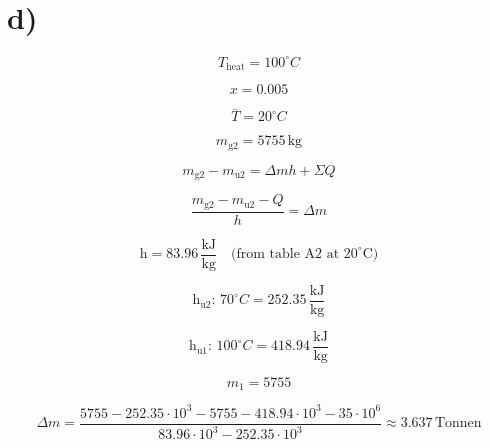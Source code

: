 

\section*{d)}

\[
T_{\text{heat}} = 100^\circ C
\]

\[
x = 0.005
\]

\[
\bar{T} = 20^\circ C
\]

\[
m_{\text{g2}} = 5755 \, \text{kg}
\]

\[
m_{\text{g2}} - m_{\text{u2}} = \Delta m h + \Sigma Q
\]

\[
\frac{m_{\text{g2}} - m_{\text{u2}} - Q}{h} = \Delta m
\]

\[
\text{h} = 83.96 \, \frac{\text{kJ}}{\text{kg}} \quad \text{(from table A2 at 20}^\circ \text{C)}
\]

\[
\text{h}_{\text{u2}}: \, 70^\circ C = 252.35 \, \frac{\text{kJ}}{\text{kg}}
\]

\[
\text{h}_{\text{u1}}: \, 100^\circ C = 418.94 \, \frac{\text{kJ}}{\text{kg}}
\]

\[
m_1 = 5755
\]

\[
\Delta m = \frac{5755 - 252.35 \cdot 10^3 - 5755 - 418.94 \cdot 10^3 - 35 \cdot 10^6}{83.96 \cdot 10^3 - 252.35 \cdot 10^3} \approx 3.637 \, \text{Tonnen}
\]